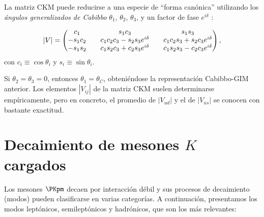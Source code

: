 La matriz CKM puede reducirse a una especie de ``forma canónica'' utilizando los \textit{ángulos generalizados de Cabibbo} $\theta_{1}$, $\theta_{2}$, $\theta_{3}$, y un factor de fase $e^{i\delta}$ \cite{Griffiths2008}:

\begin{equation}
\begingroup 
\renewcommand*{\arraystretch}{0.8}
\setlength\arraycolsep{10pt}
|V|=
\begin{pmatrix} c_{1} & s_{1}c_{3} & s_{1}s_{3} \\ -s_{1}c_{2} & c_{1}c_{2}c_{3}-s_{2}s_{3}e^{i\delta } & c_{1}c_{2}s_{3}+s_{2}c_{3}e^{i\delta } \\ -s_{1}s_{2} & c_{1}s_{2}c_{3}+c_{2}s_{3}e^{i\delta } & c_{1}s_{2}s_{3}-c_{2}c_{3}e^{i\delta } \end{pmatrix} , 
\endgroup
\end{equation}
\newline
con $c_{i}\equiv \cos \theta _{i}$ y $s_{i}\equiv \sin \theta _{i}$.

Si $\theta _{2}=\theta _{3}=0$, entonces $\theta _{1}=\theta _{C}$, obteniéndose la representación Cabibbo-GIM anterior. Los elementos $|V_{ij}|$ de la matriz CKM suelen determinarse empíricamente, pero en concreto, el promedio de $|V_{ud}|$ y el de $|V_{us}|$ se conocen con bastante exactitud.\\

\section{Decaimiento de mesones $K$ cargados}
\label{sec:charged_kaon_decay}
Los mesones $\PKpm$ decaen por interacción débil y sus procesos de decaimiento (modos) pueden clasificarse en varias categorías. A continuación, presentamos los modos leptónicos, semileptónicos y hadrónicos, que son los más relevantes:

